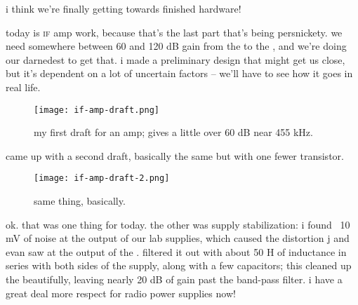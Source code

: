 i think we're finally getting towards finished hardware!

today is \textsc{if} amp work, because that's the last part that's being
persnickety. we need somewhere between 60 and 120 dB gain from the \lna to the
\adc, and we're doing our darnedest to get that. i made a preliminary design
that might get us close, but it's dependent on a lot of uncertain factors --
we'll have to see how it goes in real life.

\begin{figure}[H]
	\centering
	\texttt{[image: if-amp-draft.png]}
	\caption{my first draft for an amp; gives a little over 60 dB near 455
	kHz.}
\end{figure}

came up with a second draft, basically the same but with one fewer transistor.

\begin{figure}[H]
	\centering
	\texttt{[image: if-amp-draft-2.png]}
	\caption{same thing, basically.}
\end{figure}

ok. that was one thing for today. the other was supply stabilization: i found
~10 mV of noise at the output of our lab supplies, which caused the distortion
j and evan saw at the output of the \lna. filtered it out with about 50 \textmu
H of inductance in series with both sides of the supply, along with a few
capacitors; this cleaned up the \lna beautifully, leaving nearly 20 dB of gain
past the band-pass \rf filter. i have a great deal more respect for radio power
supplies now!
